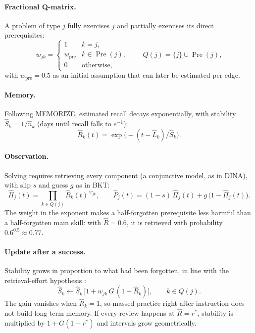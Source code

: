 \documentclass[runningheads]{llncs}
\newcommand{\Pre}{\operatorname{Pre}}
\newcommand{\Rh}{\hat R}
\newcommand{\Sh}{\hat S}
\newcommand{\Lh}{\hat L}
\newcommand{\Pih}{\hat\Pi}
\newcommand{\rstar}{r^{\ast}}
\begin{document}
\paragraph{Fractional Q-matrix.} A problem of type $j$ fully exercises $j$ and partially exercises its direct prerequisites:
\begin{equation}
w_{jk}=\begin{cases}1 & k=j,\\ w_{\mathrm{pre}} & k\in\Pre(j),\\ 0 & \text{otherwise,}\end{cases}
\qquad Q(j)=\{j\}\cup\Pre(j),
\label{eq:w}
\end{equation}
with $w_{\mathrm{pre}}=0.5$ as an initial assumption that can later be estimated per edge.

\paragraph{Memory.} Following MEMORIZE, estimated recall decays exponentially, with stability $\Sh_k=1/\hat n_k$ (days until recall falls to $e^{-1}$):
\begin{equation}
\Rh_k(t)=\exp\bigl(-(t-\Lh_k)/\Sh_k\bigr).
\label{eq:mem}
\end{equation}

\paragraph{Observation.} Solving requires retrieving every component (a conjunctive model, as in DINA), with slip $s$ and guess $g$ as in BKT:
\begin{equation}
\Pih_j(t)=\prod_{k\in Q(j)}\Rh_k(t)^{\,w_{jk}},\qquad
\hat P_j(t)=(1-s)\,\Pih_j(t)+g\,\bigl(1-\Pih_j(t)\bigr).
\label{eq:obs}
\end{equation}
The weight in the exponent makes a half-forgotten prerequisite less harmful than a half-forgotten main skill: with $\Rh=0.6$, it is retrieved with probability $0.6^{0.5}\approx0.77$.

\paragraph{Update after a success.} Stability grows in proportion to what had been forgotten, in line with the retrieval-effort hypothesis \cite{pyc2009}:
\begin{equation}
\Sh_k\leftarrow\Sh_k\,\bigl[1+w_{jk}\,G\,(1-\Rh_k)\bigr],\qquad k\in Q(j).
\label{eq:success}
\end{equation}
The gain vanishes when $\Rh_k=1$, so massed practice right after instruction does not build long-term memory. If every review happens at $\Rh=\rstar$, stability is multiplied by $1+G(1-\rstar)$ and intervals grow geometrically.
\end{document}
